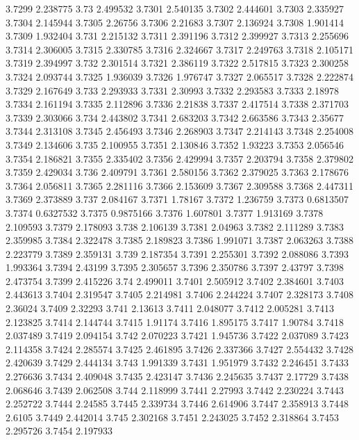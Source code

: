 3.7299  2.238775
3.73  2.499532
3.7301  2.540135
3.7302  2.444601
3.7303  2.335927
3.7304  2.145944
3.7305  2.26756
3.7306  2.21683
3.7307  2.136924
3.7308  1.901414
3.7309  1.932404
3.731  2.215132
3.7311  2.391196
3.7312  2.399927
3.7313  2.255696
3.7314  2.306005
3.7315  2.330785
3.7316  2.324667
3.7317  2.249763
3.7318  2.105171
3.7319  2.394997
3.732  2.301514
3.7321  2.386119
3.7322  2.517815
3.7323  2.300258
3.7324  2.093744
3.7325  1.936039
3.7326  1.976747
3.7327  2.065517
3.7328  2.222874
3.7329  2.167649
3.733  2.293933
3.7331  2.30993
3.7332  2.293583
3.7333  2.18978
3.7334  2.161194
3.7335  2.112896
3.7336  2.21838
3.7337  2.417514
3.7338  2.371703
3.7339  2.303066
3.734  2.443802
3.7341  2.683203
3.7342  2.663586
3.7343  2.35677
3.7344  2.313108
3.7345  2.456493
3.7346  2.268903
3.7347  2.214143
3.7348  2.254008
3.7349  2.134606
3.735  2.100955
3.7351  2.130846
3.7352  1.93223
3.7353  2.056546
3.7354  2.186821
3.7355  2.335402
3.7356  2.429994
3.7357  2.203794
3.7358  2.379802
3.7359  2.429034
3.736  2.409791
3.7361  2.580156
3.7362  2.379025
3.7363  2.178676
3.7364  2.056811
3.7365  2.281116
3.7366  2.153609
3.7367  2.309588
3.7368  2.447311
3.7369  2.373889
3.737  2.084167
3.7371  1.78167
3.7372  1.236759
3.7373  0.6813507
3.7374  0.6327532
3.7375  0.9875166
3.7376  1.607801
3.7377  1.913169
3.7378  2.109593
3.7379  2.178093
3.738  2.106139
3.7381  2.04963
3.7382  2.111289
3.7383  2.359985
3.7384  2.322478
3.7385  2.189823
3.7386  1.991071
3.7387  2.063263
3.7388  2.223779
3.7389  2.359131
3.739  2.187354
3.7391  2.255301
3.7392  2.088086
3.7393  1.993364
3.7394  2.43199
3.7395  2.305657
3.7396  2.350786
3.7397  2.43797
3.7398  2.473754
3.7399  2.415226
3.74  2.499011
3.7401  2.505912
3.7402  2.384601
3.7403  2.443613
3.7404  2.319547
3.7405  2.214981
3.7406  2.244224
3.7407  2.328173
3.7408  2.36024
3.7409  2.32293
3.741  2.13613
3.7411  2.048077
3.7412  2.005281
3.7413  2.123825
3.7414  2.144744
3.7415  1.91174
3.7416  1.895175
3.7417  1.90784
3.7418  2.037489
3.7419  2.094154
3.742  2.070223
3.7421  1.945736
3.7422  2.037089
3.7423  2.114358
3.7424  2.285574
3.7425  2.461895
3.7426  2.337366
3.7427  2.554432
3.7428  2.420639
3.7429  2.444134
3.743  1.991339
3.7431  1.951979
3.7432  2.246451
3.7433  2.276636
3.7434  2.409048
3.7435  2.423147
3.7436  2.245635
3.7437  2.17729
3.7438  2.068646
3.7439  2.062508
3.744  2.118999
3.7441  2.27993
3.7442  2.230224
3.7443  2.252722
3.7444  2.24585
3.7445  2.339734
3.7446  2.614906
3.7447  2.358913
3.7448  2.6105
3.7449  2.442014
3.745  2.302168
3.7451  2.243025
3.7452  2.318864
3.7453  2.295726
3.7454  2.197933
